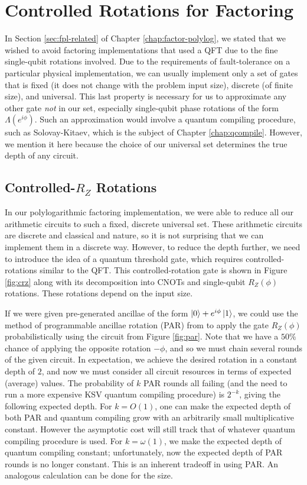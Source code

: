 \section{Controlled Rotations for Factoring}
\label{sec:fsl-qcompile}

In Section \ref{sec:fpl-related} of Chapter \ref{chap:factor-polylog}, we stated that we wished to avoid
factoring implementations that used a QFT due to the fine
single-qubit rotations involved. Due to the requirements of
fault-tolerance on a particular physical implementation,
we can usually implement only a set of gates that is fixed
(it does not change with the problem input size), discrete (of finite size),
and universal. This last property is necessary for us to approximate any
other gate \emph{not} in our set, especially single-qubit phase rotations
of the form $\Lambda(e^{i \phi})$. Such an approximation would involve
a quantum compiling procedure, such as Solovay-Kitaev, which is the
subject of Chapter \ref{chap:qcompile}. However, we mention it here
because the choice of our universal set determines the true depth
of any circuit.

\subsection{Controlled-$R_Z$ Rotations}

In our polylogarithmic factoring implementation, we were able to reduce
all our arithmetic circuits to such a fixed, discrete universal set.
These arithmetic circuits are discrete and classical and nature, so it is
not surprising that we can implement them in a discrete way.
However, to reduce the depth further, we need to introduce the idea of
a quantum threshold gate, which requires controlled-rotations similar to
the QFT. This controlled-rotation gate is shown in Figure \ref{fig:crz}
along with its decomposition into CNOTs and single-qubit $R_Z(\phi)$
rotations.
These rotations depend on the input size.

If we were given pre-generated ancillae of the form
$\left\vert{0}\right\rangle + e^{i\phi}\left\vert{1}\right\rangle$, we could use the method of programmable ancillae rotation (PAR) from
\cite{Jones2012}
to apply the gate $R_Z(\phi)$ probabilistically
using the circuit from Figure \ref{fig:par}. Note that we have a $50\%$
chance
of applying the opposite rotation $-\phi$, and so we must chain
several rounds of the given circuit. In expectation, we achieve the
desired rotation in a constant depth of $2$, and now we must consider
all circuit resources in terms of expected (average) values. The 
probability of $k$ PAR rounds all failing (and the need to run a
more expensive KSV quantum compiling procedure) is $2^{-k}$, giving
the following expected depth. For $k = O(1)$, one can make the
expected depth of both PAR and quantum compiling grow with an arbitrarily small multiplicative constant.
However the asymptotic cost will still track that of whatever
quantum compiling procedure is used. For $k = \omega(1)$, we make
the expected depth of quantum compiling constant; unfortunately, now
the expected depth of PAR rounds is no longer constant. This is an
inherent tradeoff in using PAR.
An analogous calculation can be done
for the size.

